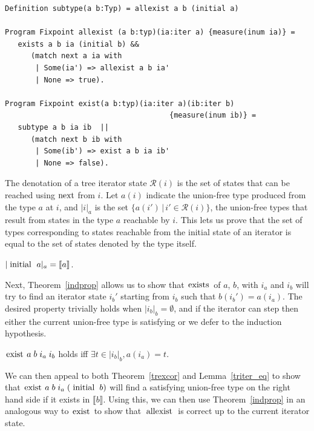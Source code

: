 \documentclass[a4paper,english]{lipics-v2019}
\newcommand{\denotes}[1]{\llbracket #1 \rrbracket}
\renewcommand{\c}[1]{\ensuremath{\text{\lstinline{#1}}}\xspace}
\begin{document}
\begin{lstlisting}
Definition subtype(a b:Typ) = allexist a b (initial a)

Program Fixpoint allexist (a b:typ)(ia:iter a) {measure(inum ia)} =
   exists a b ia (initial b) && 
      (match next a ia with 
       | Some(ia') => allexist a b ia' 
       | None => true).

Program Fixpoint exist(a b:typ)(ia:iter a)(ib:iter b)
                                      {measure(inum ib)} =
   subtype a b ia ib  || 
      (match next b ib with 
       | Some(ib') => exist a b ia ib' 
       | None => false).
\end{lstlisting}

\newcommand{\irdn}[1]{\ensuremath{\mathcal{R}({#1})}}
\newcommand{\irch}[2]{\ensuremath{|#1|_{#2}}}

\noindent
The denotation of a tree iterator state $\irdn{i}$ is the set of states that
can be reached using \c{next} from $i$. Let $a(i)$ indicate the union-free
type produced from the type $a$ at $i$, and \irch{i}{a} is the set
$\{a(i')\,|\,i'\in\irdn{i}\}$, the union-free types that result from states
in the type $a$ reachable by $i$.  This lets us prove that the set of types
corresponding to states reachable from the initial state of an iterator is
equal to the set of states denoted by the type itself.

\begin{lemma}\label{triter_eq}
$\irch{\c{initial}~a}{a} = \denotes{a}$.
\end{lemma}

\noindent
Next, Theorem~\ref{indprop} allows us to show that \c{exists} of $a$, $b$,
with $i_a$ and $i_b$ will try to find an iterator state $i_b'$ starting from
$i_b$ such that $b(i_b') = a(i_a)$. The desired property trivially holds
when $\irch{i_b}{b} = \emptyset$, and if the iterator can step then either
the current union-free type is satisfying or we defer to the induction
hypothesis.


\begin{theorem}\label{trexcor}
$\c{exist}\;a\;b\;i_a\;i_b$ holds iff $\exists t\in\irch{i_b}{b},a(i_a)= t$.
\end{theorem}

\noindent
We can then appeal to both Theorem~\ref{trexcor} and Lemma~\ref{triter_eq}
to show that $\c{exist}\;a\;b\;i_a\;(\c{initial}\;b)$ will find a satisfying
union-free type on the right hand side if it exists in $\denotes{b}$. Using
this, we can then use Theorem~\ref{indprop} in an analogous way to \c{exist}
to show that \c{allexist} is correct up to the current iterator state.
\end{document}
